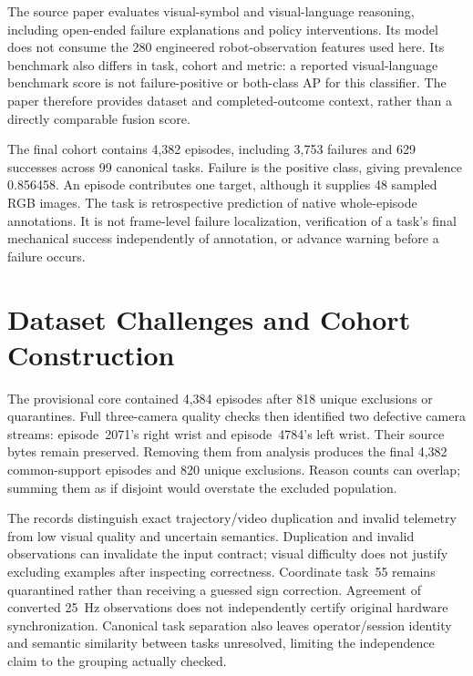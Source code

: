 The source paper evaluates visual-symbol and visual-language reasoning, including open-ended failure explanations and policy interventions. Its model does not consume the 280 engineered robot-observation features used here. Its benchmark also differs in task, cohort and metric: a reported visual-language benchmark score is not failure-positive or both-class AP for this classifier. The paper therefore provides dataset and completed-outcome context, rather than a directly comparable fusion score.

The final cohort contains 4,382 episodes, including 3,753 failures and 629 successes across 99 canonical tasks. Failure is the positive class, giving prevalence 0.856458. An episode contributes one target, although it supplies 48 sampled RGB images. The task is retrospective prediction of native whole-episode annotations. It is not frame-level failure localization, verification of a task's final mechanical success independently of annotation, or advance warning before a failure occurs.

\section{Dataset Challenges and Cohort Construction}
The provisional core contained 4,384 episodes after 818 unique exclusions or quarantines. Full three-camera quality checks then identified two defective camera streams: episode~2071's right wrist and episode~4784's left wrist. Their source bytes remain preserved. Removing them from analysis produces the final 4,382 common-support episodes and 820 unique exclusions. Reason counts can overlap; summing them as if disjoint would overstate the excluded population.

The records distinguish exact trajectory/video duplication and invalid telemetry from low visual quality and uncertain semantics. Duplication and invalid observations can invalidate the input contract; visual difficulty does not justify excluding examples after inspecting correctness. Coordinate task~55 remains quarantined rather than receiving a guessed sign correction. Agreement of converted 25~Hz observations does not independently certify original hardware synchronization. Canonical task separation also leaves operator/session identity and semantic similarity between tasks unresolved, limiting the independence claim to the grouping actually checked.


